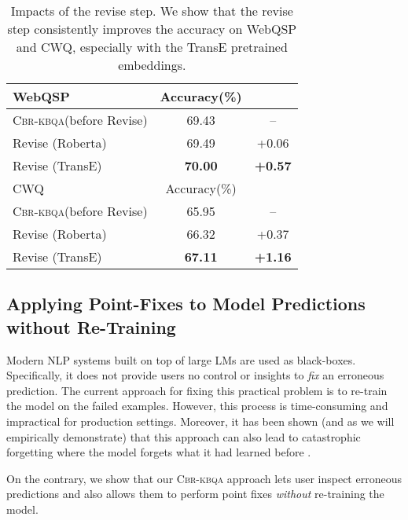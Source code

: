 \documentclass{article}
\newcommand{\alg}{\textsc{Cbr-kbqa}\xspace}
\begin{document}
\begin{table}[t]
    \centering
    \small
    \begin{tabular}{l c c}
    \toprule
        WebQSP &  Accuracy(\%) & \\
        \midrule
        \alg (before Revise) & 69.43 & --\\
        Revise (Roberta) & 69.49 & +0.06\\
        Revise (TransE) & \textbf{70.00} & \textbf{+0.57}\\
        \midrule
        CWQ &  Accuracy(\%) & \\
        \midrule
        \alg (before Revise) & 65.95 & --\\
        Revise (Roberta) & 66.32 & +0.37 \\
        Revise (TransE) & \textbf{67.11} & \textbf{+1.16}\\
    \bottomrule
    \end{tabular}
    \caption{Impacts of the revise step. We show that the revise step consistently improves the accuracy on WebQSP and CWQ, especially with the TransE pretrained embeddings.}
    \label{tab:revise}
\end{table}


\subsection{Applying Point-Fixes to Model Predictions without Re-Training}
\label{sub:analysis}
Modern NLP systems built on top of large LMs are used as black-boxes. Specifically, it does not provide users no control or insights to \emph{fix} an erroneous prediction. The current approach for fixing this practical problem is to re-train the model on the failed examples. However, this process is time-consuming and impractical for production settings. Moreover, it has been shown (and as we will empirically demonstrate) that this approach can also lead to catastrophic forgetting where the model forgets what it had learned before \cite{hinton1987using,mccloskey1989catastrophic,kirkpatrick2017overcoming,toneva2018empirical}.

On the contrary, we show that our \alg approach lets user inspect erroneous predictions and also allows them to perform point fixes \emph{without} re-training the model. 
\end{document}
